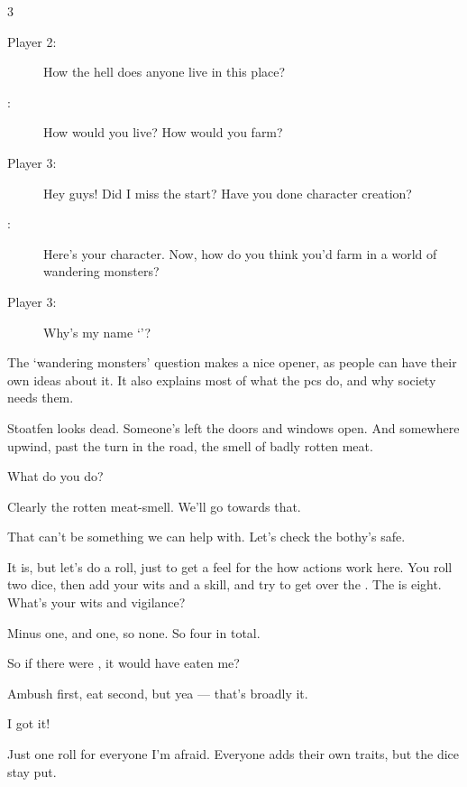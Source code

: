\begin{multicols}{3}
\begin{description}
  \item[Player 2:]
  How the hell does anyone live in this place?
  \item[:]
  How would you live?
  How would you farm?
  \item[Player 3:]
  Hey guys!
  Did I miss the start?
  Have you done character creation?
  \item[:]
  Here's your character.
  Now, how do you think you'd farm in a world of wandering monsters?
  \item[Player 3:]
  Why's my name `\composeHumanName'?
\end{description}

\bigLine
\vspace{2em}

\noindent
The `wandering monsters' question makes a nice opener, as people can have their own ideas about it.
It also explains most of what the \glspl{pc} do, and why society needs them.

\bigLine

\begin{description}\sf
  \item[\Glsentrytext{gm}:]
  Stoatfen looks dead.
  Someone's left the doors and windows open.
  And somewhere upwind, past the turn in the road, the smell of badly rotten meat.

  What do you do?
  \item[Player 1:]
  Clearly the rotten meat-smell.
  We'll go towards that.
  \item[Player 2:]
  That can't be something we can help with.
  Let's check the \gls{bothy}'s safe.
  \item[\Glsentrytext{gm}:]
  It is, but let's do a roll, just to get a feel for the how actions work here.
  You roll two dice, then add your wits and a skill, and try to get over the .
  The  is eight.
  What's your wits and vigilance?
  \item[Player 2:]
  Minus one, and one, so none.
  So four in total.

  So if there were , it would have eaten me?
  \item[\Gls{gm}:]
  Ambush first, eat second, but yea --- that's broadly it.
  \item[Player 1:]
  I got it!
  \item[\Gls{gm}:]
  Just one roll for everyone I'm afraid.
  Everyone adds their own traits, but the dice stay put.


\end{description}
\end{multicols}
